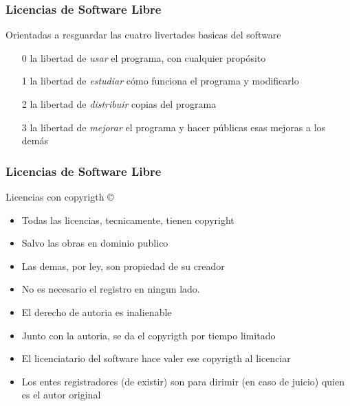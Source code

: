 \documentclass[11pt]{beamer}
\begin{document}
\begin{frame}
\frametitle{Licencias de Software Libre}
\begin{center}
\begin{Large}
Orientadas a resguardar las cuatro livertades basicas del software
\end{Large}
\end{center}
\pause

\begin{enumerate}[<+-| alert@+>]
\item[0] la libertad de \emph{usar} el programa, con cualquier propósito
\item[1] la libertad de \emph{estudiar} cómo funciona el programa y modificarlo
\item[2] la libertad de \emph{distribuir} copias del programa
\item[3] la libertad de \emph{mejorar} el programa y hacer públicas esas mejoras a los demás
\end{enumerate}
\end{frame}

\begin{frame}
\frametitle{Licencias de Software Libre}
\begin{center}
\begin{Large}
Licencias con copyrigth {\Huge \copyright}
\end{Large}
\end{center}

\begin{itemize}[<+-| alert@+>]
\item Todas las licencias, tecnicamente, tienen copyright
\item Salvo las obras en dominio publico
\item Las demas, por ley, son propiedad de su creador
\item No es necesario el registro en ningun lado.
\item El derecho de autoria es inalienable
\item Junto con la autoria, se da el copyrigth por tiempo limitado
\item El licenciatario del software hace valer ese copyrigth al licenciar
\item Los entes registradores (de existir) son para dirimir (en caso de juicio) quien es el autor original
\end{itemize}

\end{frame}
\end{document}
